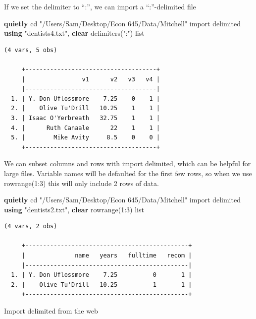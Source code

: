\documentclass[
]{book}
\newenvironment{Shaded}{\begin{snugshade}}{\end{snugshade}}
\newcommand{\KeywordTok}[1]{\textcolor[rgb]{0.13,0.29,0.53}{\textbf{#1}}}
\newcommand{\NormalTok}[1]{#1}
\newcommand{\OtherTok}[1]{\textcolor[rgb]{0.56,0.35,0.01}{#1}}
\newcommand{\StringTok}[1]{\textcolor[rgb]{0.31,0.60,0.02}{#1}}
\begin{document}
If we set the delimiter to ``:'', we can import a ``:''-delimited file

\begin{Shaded}
\begin{Highlighting}[]
\KeywordTok{quietly}\NormalTok{ cd }\StringTok{"/Users/Sam/Desktop/Econ 645/Data/Mitchell"}
\NormalTok{import delimited }\KeywordTok{using} \StringTok{"dentists4.txt"}\NormalTok{, }\KeywordTok{clear}\NormalTok{ delimiters(}\StringTok{":"}\NormalTok{) }
\OtherTok{list}
\end{Highlighting}
\end{Shaded}

\begin{verbatim}
(4 vars, 5 obs)

     +-------------------------------------+
     |                v1      v2   v3   v4 |
     |-------------------------------------|
  1. | Y. Don Uflossmore    7.25    0    1 |
  2. |    Olive Tu'Drill   10.25    1    1 |
  3. | Isaac O'Yerbreath   32.75    1    1 |
  4. |      Ruth Canaale      22    1    1 |
  5. |        Mike Avity     8.5    0    0 |
     +-------------------------------------+
\end{verbatim}

We can subset columns and rows with import delimited, which can be helpful for large files. Variable names will be defaulted for the first few rows, so when we use rowrange(1:3) this will only include 2 rows of data.

\begin{Shaded}
\begin{Highlighting}[]
\KeywordTok{quietly}\NormalTok{ cd }\StringTok{"/Users/Sam/Desktop/Econ 645/Data/Mitchell"}
\NormalTok{import delimited }\KeywordTok{using} \StringTok{"dentists2.txt"}\NormalTok{, }\KeywordTok{clear}\NormalTok{ rowrange(1:3)}
\OtherTok{list}
\end{Highlighting}
\end{Shaded}

\begin{verbatim}
(4 vars, 2 obs)

     +----------------------------------------------+
     |              name   years   fulltime   recom |
     |----------------------------------------------|
  1. | Y. Don Uflossmore    7.25          0       1 |
  2. |    Olive Tu'Drill   10.25          1       1 |
     +----------------------------------------------+
\end{verbatim}

Import delimited from the web
\end{document}
